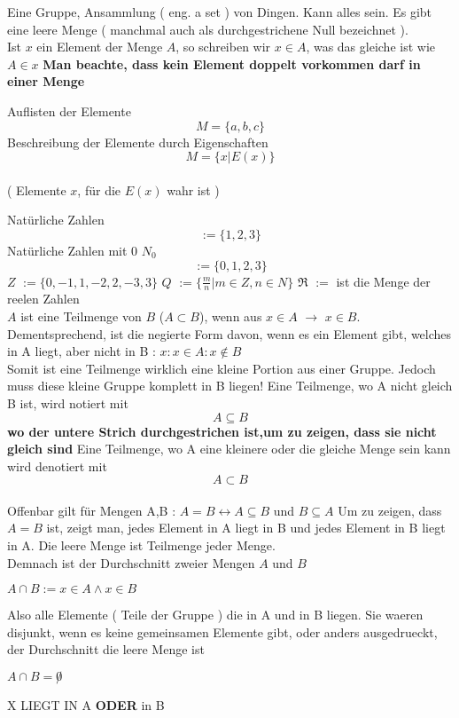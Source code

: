 \documentclass[headsepline,12pt,a4paper]{scrartcl}
\makeatletter
\def\myItem{%
   \@ifnextchar[ \@myItem{\@noitemargtrue\@myItem[\@itemlabel]}}
\def\@myItem[#1]{\item[#1]\mbox{}\\}
\makeatother
\begin{document}
\begin{itemize}

\myItem[Menge]
Eine Gruppe, Ansammlung ( eng. a set ) von Dingen. Kann alles sein. Es gibt eine leere Menge {} ( manchmal auch als durchgestrichene Null bezeichnet ). \\
 Ist $x$ ein Element der Menge $A$, so schreiben wir $x \in A$, was das gleiche ist wie $ A \in x $
 \textbf{ Man beachte, dass kein Element doppelt vorkommen darf in einer Menge}


\myItem[Nomenklatur]
 Auflisten der Elemente $$ M= \{a,b,c\} $$
 Beschreibung der Elemente durch Eigenschaften 
$$ M= \{ x|E(x) \} $$ \\
 ( Elemente $x$, für die $E(x)$ wahr ist ) 


\myItem[Zahlbereiche]
 Natürliche Zahlen $$ := \{1,2,3\} $$
 Natürliche Zahlen mit 0 $N_0$ $$ := \{0,1,2,3\} $$
 $Z$ $:= \{0,-1,1,-2,2,-3,3\}$ 
 $Q$ $:= \{\frac{m}{n}| m\in Z , n \in N \}$
 $\Re$ $:=$ ist die Menge der reelen Zahlen \\

\myItem[Teilmenge]
 $A$ ist eine Teilmenge von $B$ ($A \subset B $), wenn aus $ x \in  A $ $\rightarrow$ $ x \in B $. Dementsprechend, ist die negierte Form davon, wenn es ein Element gibt, welches in A liegt, aber nicht in B : $ x : x \in A : x \not \in B$ \\
 Somit ist eine Teilmenge wirklich eine kleine Portion aus einer Gruppe. Jedoch muss diese kleine Gruppe komplett in B liegen!
 Eine Teilmenge, wo A nicht gleich B ist, wird notiert mit $$ A \subseteq B $$ \textbf{wo der untere Strich durchgestrichen ist,um zu zeigen, dass sie nicht gleich sind}
 Eine Teilmenge, wo A eine kleinere oder die gleiche Menge sein kann wird denotiert mit $$ A \subset B $$  \\
 Offenbar gilt für Mengen A,B : $ A = B \leftrightarrow A \subseteq B $ und $ B \subseteq A $
 Um zu zeigen, dass $ A = B $ ist, zeigt man, jedes Element in A liegt in B und jedes Element in B liegt in A. Die leere Menge ist Teilmenge jeder Menge.\\


\myItem[Durchschnitt]
 Demnach ist der Durchschnitt zweier Mengen $A$ und $B$ \\
\begin{center}
$ A \cap B := {x \in A \wedge x \in B } $
\end{center}
Also alle Elemente ( Teile der Gruppe ) die in A und in B liegen.
 Sie waeren disjunkt, wenn es keine gemeinsamen Elemente gibt, oder anders ausgedrueckt, der Durchschnitt die leere Menge ist
\begin{center}
$ A \cap B = \not 0 $
\end{center}
 X LIEGT IN A \textbf{ODER} in B 


\end{itemize}
\end{document}
